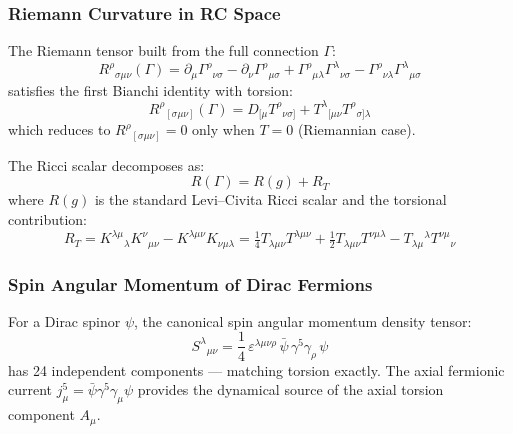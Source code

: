 \documentclass[12pt,a4paper]{article}
\newcommand{\spin}{S^{\lambda}{}_{\mu\nu}}
\numberwithin{equation}{section}
\begin{document}
\subsubsection{Riemann Curvature in RC Space}

The Riemann tensor built from the full connection $\Gamma$:
\begin{equation}
  R^\rho{}_{\sigma\mu\nu}(\Gamma) = \partial_\mu\Gamma^\rho{}_{\nu\sigma}
  - \partial_\nu\Gamma^\rho{}_{\mu\sigma}
  + \Gamma^\rho{}_{\mu\lambda}\Gamma^\lambda{}_{\nu\sigma}
  - \Gamma^\rho{}_{\nu\lambda}\Gamma^\lambda{}_{\mu\sigma}
  \label{eq:riemann}
\end{equation}
satisfies the first Bianchi identity with torsion:
\begin{equation}
  R^\rho{}_{[\sigma\mu\nu]}(\Gamma) = D_{[\mu}T^\rho{}_{\nu\sigma]}
  + T^\lambda{}_{[\mu\nu}T^\rho{}_{\sigma]\lambda}
  \label{eq:bianchi1}
\end{equation}
which reduces to $R^\rho{}_{[\sigma\mu\nu]} = 0$ only when $T = 0$ (Riemannian case).

The Ricci scalar decomposes as:
\begin{equation}
  R(\Gamma) = R(g) + R_T
  \label{eq:ricci_decomp}
\end{equation}
where $R(g)$ is the standard Levi--Civita Ricci scalar and the torsional contribution:
\begin{equation}
  R_T = K^{\lambda\mu}{}_\lambda K^\nu{}_{\mu\nu}
  - K^{\lambda\mu\nu}K_{\nu\mu\lambda}
  = \tfrac{1}{4}T_{\lambda\mu\nu}T^{\lambda\mu\nu}
  + \tfrac{1}{2}T_{\lambda\mu\nu}T^{\nu\mu\lambda}
  - T_{\lambda\mu}{}^\lambda T^{\nu\mu}{}_\nu
  \label{eq:torsional_ricci}
\end{equation}

\subsubsection{Spin Angular Momentum of Dirac Fermions}

For a Dirac spinor $\psi$, the canonical spin angular momentum density tensor:
\begin{equation}
  \spin = \frac{1}{4}\,\varepsilon^{\lambda\mu\nu\rho}\,\bar{\psi}\,\gamma^5\gamma_\rho\,\psi
  \label{eq:spin_tensor}
\end{equation}
has 24 independent components --- matching torsion exactly.
The axial fermionic current $j^5_\mu = \bar\psi\gamma^5\gamma_\mu\psi$
provides the dynamical source of the axial torsion component $A_\mu$.
\end{document}
